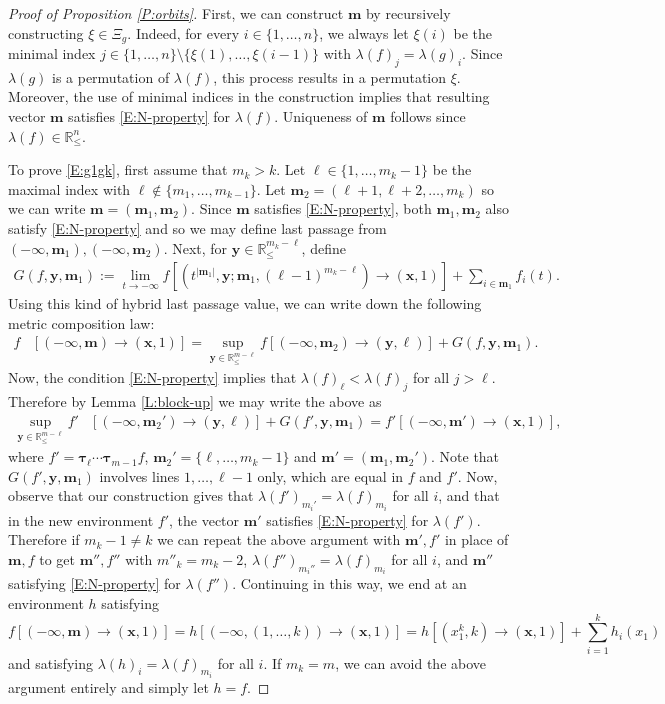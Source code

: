 \documentclass[11pt]{article}
\newcommand{\R}{\mathbb{R}}
\newcommand{\la}{\lambda}
\newcommand{\smin}{\setminus}
\newcommand{\bx}{\mathbf{x}}
\newcommand{\bm}{\mathbf{m}}
\newcommand{\by}{\mathbf{y}}
\theoremstyle{definition} %
\theoremstyle{remark} %
\newcommand{\btau}{{\boldsymbol \tau}}
\begin{document}
\begin{proof}[Proof of Proposition \ref{P:orbits}]
First, we can construct $\bm$ by recursively constructing $\xi \in \Xi_g$. Indeed, for every $i \in \{1, \dots, n\}$, we always let $\xi(i)$ be the minimal index $j \in \{1, \dots, n\} \smin \{\xi(1), \dots, \xi(i-1)\}$ with $\la(f)_j = \la(g)_i$. Since $\la(g)$ is a permutation of $\la(f)$, this process results in a permutation $\xi$. Moreover, the use of minimal indices in the construction implies that resulting vector $\bm$ satisfies \eqref{E:N-property} for $\la(f)$. Uniqueness of $\bm$ follows since $\la(f) \in \R^n_\le$.

To prove \eqref{E:g1gk}, first assume that $m_k > k$. Let $\ell \in \{1, \dots, m_k - 1\}$ be the maximal index with $\ell \notin  \{m_1, \dots, m_{k-1}\}$. Let $\bm_2=(\ell+1,\ell+2,\ldots, m_k)$ so we can write $\bm = (\bm_1, \bm_2)$. Since $\bm$ satisfies \eqref{E:N-property}, both $\bm_1, \bm_2$ also satisfy \eqref{E:N-property} and so we may define last passage from $(-\infty, \bm_1), (-\infty, \bm_2)$. Next, for $\by \in \R^{m_k-\ell}_\le$, define 
\begin{align*}
G(f, \by, \bm_1) := \lim_{t \to -\infty} f[(t^{|\bm_1|}, \by ; \bm_1, (\ell-1)^{m_k-\ell}) \to (\bx, 1)] + \sum_{i \in \bm_1} f_i(t).
\end{align*}
Using this kind of hybrid last passage value, we can write down the following metric composition law:
\begin{align*}
f&[(-\infty, \bm)\to (\bx, 1)] = \sup_{\by \in \R^{m - \ell}_\le}f[(-\infty,\bm_2)\to (\by, \ell)]+G(f, \by, \bm_1).
\end{align*}
Now, the condition \eqref{E:N-property} implies that $\la(f)_\ell < \la(f)_{j}$ for all $j > \ell$. Therefore by Lemma \ref{L:block-up} we may write the above as 
\begin{align*}
\sup_{\by \in \R^{m - \ell}_\le}f'&[(-\infty,\bm_2')\to (\by, \ell)]+G(f', \by, \bm_1) =  f'[(-\infty,\bm')\to (\bx, 1)],
\end{align*}
where $f' =\btau_{\ell}\cdots\btau_{m-1}f$, $\bm_2'=\{\ell,\ldots,m_k-1\}$ and $\bm'=(\bm_1, \bm_2')$. Note that $G(f', \by, \bm_1)$ involves lines $1,\ldots, \ell-1$ only, which are equal in $f$ and $f'$. Now, observe that our construction gives that $\la(f')_{m_i'} = \la(f)_{m_i}$ for all $i$, and that in the new environment $f'$, the vector $\bm'$  satisfies \eqref{E:N-property} for $\la(f')$. Therefore if $m_k-1 \ne k$ we can repeat the above argument with $\bm', f'$ in place of $\bm, f$ to get $\bm'', f''$ with $m''_{k} = m_k- 2$, $\la(f'')_{m_i''} = \la(f)_{m_i}$ for all $i$, and $\bm''$ satisfying \eqref{E:N-property} for $\la(f'')$. Continuing in this way, we end at an environment $h$ satisfying 
$$
f[(-\infty ,\bm)\to (\bx, 1)] =h[(-\infty, (1, \dots, k))\to (\bx, 1)] = h[(x_1^k, k)\to (\bx, 1)] + \sum_{i=1}^k h_i(x_1)
$$
and satisfying $\la(h)_{i} = \la(f)_{m_i}$ for all $i$. If $m_k =m$, we can avoid the above argument entirely and simply let $h = f$. 


\end{proof}
\end{document}
